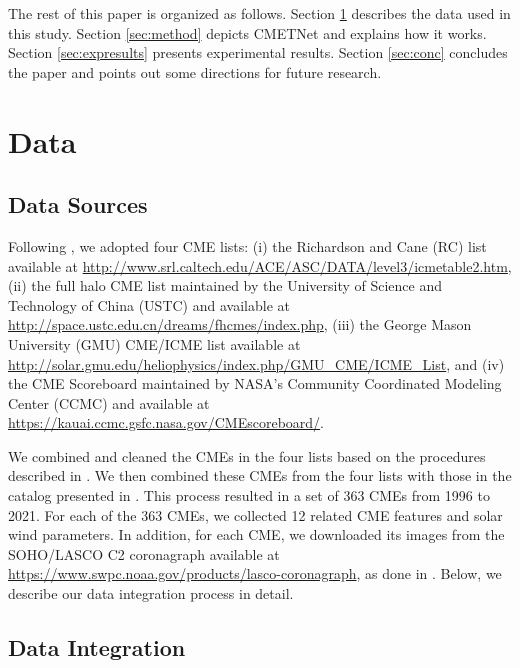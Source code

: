 \documentclass{article}
\begin{document}
The rest of this paper is organized as follows.
Section \ref{sec:datasources} describes the data used in this study. 
Section \ref{sec:method} depicts CMETNet and explains how it works.
Section \ref{sec:expresults} presents experimental results.
Section \ref{sec:conc} concludes the paper and 
points out some directions for future research.

\section{Data} \label{sec:datasources}

\subsection{Data Sources}

Following \citet{2018ApJ...855..109L}, we adopted four CME lists:
(i) the Richardson and Cane (RC) list
\citep{2010SoPh..264..189R}
available at \url{http://www.srl.caltech.edu/ACE/ASC/DATA/level3/icmetable2.htm}, 
(ii) the full halo CME list
maintained by the University of Science and Technology of China (USTC) \citep{Welcomet65:online} and 
available at \url{http://space.ustc.edu.cn/dreams/fhcmes/index.php},
(iii) the George Mason University (GMU) CME/ICME list
\citep{2017SoPh..292...80H} available at
\url{http://solar.gmu.edu/heliophysics/index.php/GMU\_CME/ICME\_List}, 
and 
(iv) the CME Scoreboard maintained by NASA's Community Coordinated Modeling Center (CCMC) 
and available at \url{https://kauai.ccmc.gsfc.nasa.gov/CMEscoreboard/}. 

We combined and cleaned the CMEs in the four lists based 
on the procedures described in \citet{2018ApJ...855..109L}.
We then combined these CMEs from the four lists with those in the 
catalog presented in \citet{2017SoPh..292...30P}.
This process resulted in 
a set of 363 CMEs from 1996 to 2021. 
For each of the 363 CMEs, we collected 12 related CME features and solar wind parameters.
In addition, for each CME, we downloaded its images 
from the SOHO/LASCO C2 coronagraph 
available at 
\url{https://www.swpc.noaa.gov/products/lasco-coronagraph},
as done in \citet{2019ApJ...881...15W}.
Below, we describe our data integration process in detail.

\subsection{Data Integration}
\end{document}
